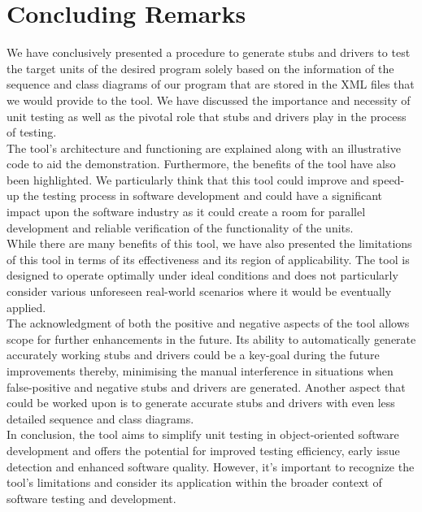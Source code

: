 \documentclass{article}
\begin{document}
\section{Concluding Remarks}

We have conclusively presented a procedure to generate stubs and drivers to test the target units of the desired program solely based on the information of the sequence and class diagrams of our program that are stored in the XML files that we would provide to the tool. We have discussed the importance and necessity of unit testing as well as the pivotal role that stubs and drivers play in the process of testing. \\ 

The tool's architecture and functioning are explained along with an illustrative code to aid the demonstration. Furthermore, the benefits of the tool have also been highlighted. We particularly think that this tool could improve and speed-up the testing process in software development and could have a significant impact upon the software industry as it could create a room for parallel development and reliable verification of the functionality of the units. \\

While there are many benefits of this tool, we have also presented the limitations of this tool in terms of its effectiveness and its region of applicability. The tool is designed to operate optimally under ideal conditions and does not particularly consider various unforeseen real-world scenarios where it would be eventually applied. \\

The acknowledgment of both the positive and negative aspects of the tool allows scope for further enhancements in the future. Its ability to automatically generate accurately working stubs and drivers could be a key-goal during the future improvements thereby, minimising the manual interference in situations when false-positive and negative stubs and drivers are generated. Another aspect that could be worked upon is to generate accurate stubs and drivers with even less detailed sequence and class diagrams. \\

In conclusion, the tool aims to simplify unit testing in object-oriented software development and offers the potential for improved testing efficiency, early issue detection and enhanced software quality. However, it's important to recognize the tool's limitations and consider its application within the broader context of software testing and development. 
\end{document}

